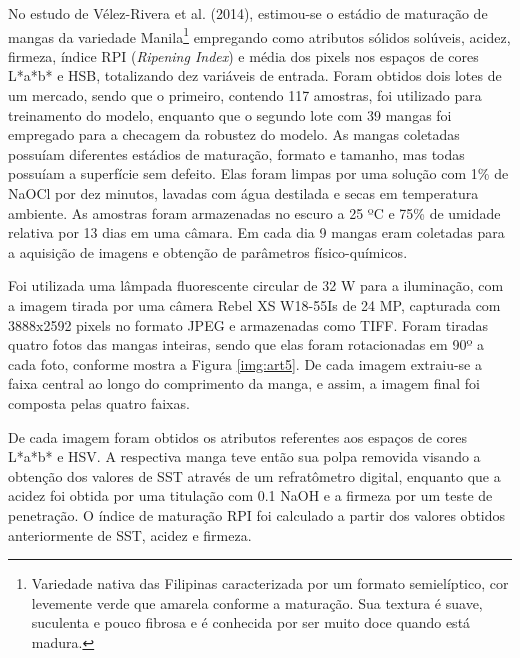 No estudo de Vélez-Rivera et al. (2014), estimou-se o estádio de maturação de mangas da variedade Manila\footnote{\label{ftnote:manila}Variedade nativa das Filipinas caracterizada por um formato semielíptico, cor levemente verde que amarela conforme a maturação. Sua textura é suave, suculenta e pouco fibrosa e é conhecida por ser muito doce quando está madura.} empregando como atributos sólidos solúveis, acidez, firmeza, índice RPI (\textit{Ripening Index}) e média dos pixels nos espaços de cores L*a*b* e HSB, totalizando dez variáveis de entrada. Foram obtidos dois lotes de um mercado, sendo que o primeiro, contendo 117 amostras, foi utilizado para treinamento do modelo, enquanto que o segundo lote com 39 mangas foi empregado para a checagem da robustez do modelo. As mangas coletadas possuíam diferentes estádios de maturação, formato e tamanho, mas todas possuíam a superfície sem defeito. Elas foram limpas por uma solução com 1\% de NaOCl por dez minutos, lavadas com água destilada e secas em temperatura ambiente. As amostras foram armazenadas no escuro a 25 ºC e 75\% de umidade relativa por 13 dias em uma câmara. Em cada dia 9 mangas eram coletadas para a aquisição de imagens e obtenção de parâmetros físico-químicos. 

Foi utilizada uma lâmpada fluorescente circular de 32 W para a iluminação, com a imagem tirada por uma câmera Rebel XS W18-55Is de 24 MP, capturada com 3888x2592 pixels no formato JPEG e armazenadas como TIFF. Foram tiradas quatro fotos das mangas inteiras, sendo que elas foram rotacionadas em 90º a cada foto, conforme mostra a Figura \ref{img:art5}. De cada imagem extraiu-se a faixa central ao longo do comprimento da manga, e assim, a imagem final foi composta pelas quatro faixas.


De cada imagem foram obtidos os atributos referentes aos espaços de cores L*a*b* e HSV. A respectiva manga teve então sua polpa removida visando a obtenção dos valores de SST através de um refratômetro digital, enquanto que a acidez foi obtida por uma titulação com 0.1 NaOH e a firmeza por um teste de penetração. O índice de maturação RPI foi calculado a partir dos valores obtidos anteriormente de SST, acidez e firmeza.

